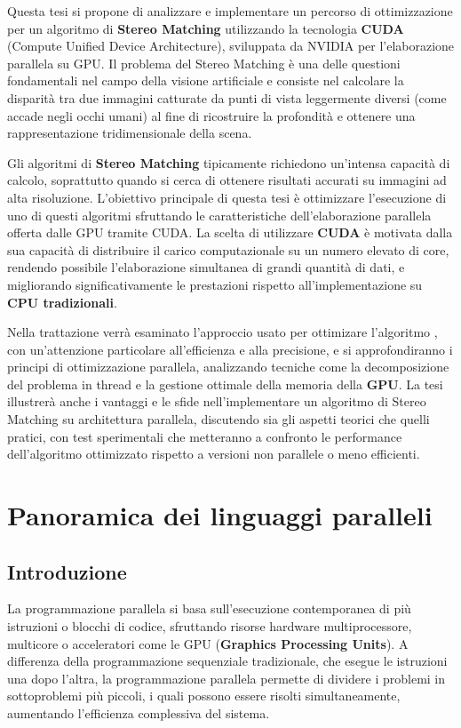 \documentclass[12pt,a4paper]{report}
\begin{document}
Questa tesi si propone di analizzare e implementare un percorso di ottimizzazione per un algoritmo di \textbf{Stereo Matching} utilizzando la tecnologia \textbf{CUDA} (Compute Unified Device Architecture), sviluppata da NVIDIA per l'elaborazione parallela su GPU. Il problema del Stereo Matching è una delle questioni fondamentali nel campo della visione artificiale e consiste nel calcolare la disparità tra due immagini catturate da punti di vista leggermente diversi (come accade negli occhi umani) al fine di ricostruire la profondità e ottenere una rappresentazione tridimensionale della scena.

Gli algoritmi di \textbf{Stereo Matching} tipicamente richiedono un'intensa capacità di calcolo, soprattutto quando si cerca di ottenere risultati accurati su immagini ad alta risoluzione. L’obiettivo principale di questa tesi è ottimizzare l'esecuzione di uno di questi algoritmi sfruttando le caratteristiche dell'elaborazione parallela offerta dalle GPU tramite CUDA. La scelta di utilizzare \textbf{CUDA} è motivata dalla sua capacità di distribuire il carico computazionale su un numero elevato di core, rendendo possibile l’elaborazione simultanea di grandi quantità di dati, e migliorando significativamente le prestazioni rispetto all'implementazione su \textbf{CPU tradizionali}.

Nella trattazione verrà esaminato l'approccio usato per ottimizare l'algoritmo  , con un'attenzione particolare all'efficienza e alla precisione, e si approfondiranno i principi di ottimizzazione parallela, analizzando tecniche come la decomposizione del problema in thread e la gestione ottimale della memoria della \textbf{GPU}. La tesi illustrerà anche i vantaggi e le sfide nell'implementare un algoritmo di Stereo Matching su architettura parallela, discutendo sia gli aspetti teorici che quelli pratici, con test sperimentali che metteranno a confronto le performance dell'algoritmo ottimizzato rispetto a versioni non parallele o meno efficienti.



\chapter{Panoramica dei linguaggi paralleli}

\section{Introduzione}

La programmazione parallela si basa sull’esecuzione contemporanea di più istruzioni o blocchi di codice, sfruttando risorse hardware multiprocessore, multicore o acceleratori come le GPU (\textbf{Graphics Processing Units}). A differenza della programmazione sequenziale tradizionale, che esegue le istruzioni una dopo l’altra, la programmazione parallela permette di dividere i problemi in sottoproblemi più piccoli, i quali possono essere risolti simultaneamente, aumentando l’efficienza complessiva del sistema.
\end{document}
